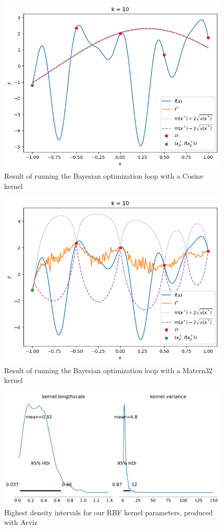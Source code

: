 \begin{figure}%
    \includegraphics[width=\textwidth]{figures/gp/cosine.png}
    \caption{Result of running the Bayesian optimization loop with a Cosine kernel}
\end{figure}

\begin{figure}%
    \includegraphics[width=\textwidth]{figures/gp/mattern.png}
    \caption{Result of running the Bayesian optimization loop with a Matern32 kernel}
\end{figure}

\begin{figure}%
    \includegraphics[width=\textwidth]{figures/gp/sample_analysis.pdf}
    \caption{Highest density intervals for our RBF kernel parameters, produced with Arviz}
\end{figure}